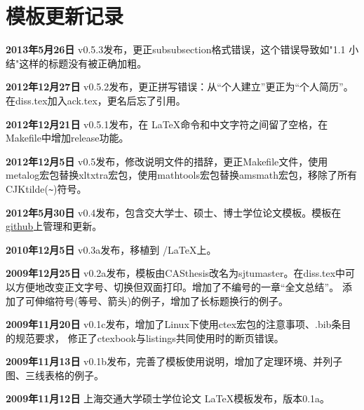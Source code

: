 
\chapter{模板更新记录}
\label{chap:updatelog}

\textbf{2013年5月26日} v0.5.3发布，更正subsubsection格式错误，这个错误导致如"1.1 小结"这样的标题没有被正确加粗。

\textbf{2012年12月27日} v0.5.2发布，更正拼写错误：从``个人建立''更正为``个人简历''。在diss.tex加入ack.tex，更名后忘了引用。

\textbf{2012年12月21日} v0.5.1发布，在 \LaTeX 命令和中文字符之间留了空格，在Makefile中增加release功能。

\textbf{2012年12月5日} v0.5发布，修改说明文件的措辞，更正Makefile文件，使用metalog宏包替换xltxtra宏包，使用mathtools宏包替换amsmath宏包，移除了所有CJKtilde(\verb+~+)符号。

\textbf{2012年5月30日} v0.4发布，包含交大学士、硕士、博士学位论文模板。模板在\href{https://github.com/weijianwen/sjtu-thesis-template-latex}{github}上管理和更新。

\textbf{2010年12月5日} v0.3a发布，移植到 \XeTeX/\LaTeX 上。

\textbf{2009年12月25日} v0.2a发布，模板由CASthesis改名为sjtumaster。在diss.tex中可以方便地改变正文字号、切换但双面打印。增加了不编号的一章“全文总结”。
添加了可伸缩符号(等号、箭头)的例子，增加了长标题换行的例子。

\textbf{2009年11月20日} v0.1c发布，增加了Linux下使用ctex宏包的注意事项、.bib条目的规范要求，
修正了ctexbook与listings共同使用时的断页错误。

\textbf{2009年11月13日} v0.1b发布，完善了模板使用说明，增加了定理环境、并列子图、三线表格的例子。

\textbf{2009年11月12日} 上海交通大学硕士学位论文 \LaTeX 模板发布，版本0.1a。

